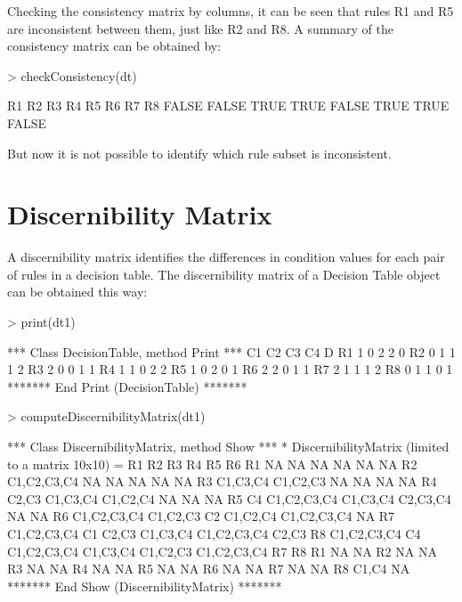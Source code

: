\documentclass[a4paper]{article}
\begin{document}
Checking the consistency matrix by columns, it can be seen that rules R1 and R5 are inconsistent between them, just like R2 and R8. A summary of the consistency matrix can be obtained by:

\begin{Schunk}
\begin{Sinput}
> checkConsistency(dt)
\end{Sinput}
\begin{Soutput}
   R1    R2    R3    R4    R5    R6    R7    R8 
FALSE FALSE  TRUE  TRUE FALSE  TRUE  TRUE FALSE 
\end{Soutput}
\end{Schunk}

But now it is not possible to identify which rule subset is inconsistent.

\section{Discernibility Matrix}

A discernibility matrix identifies the differences in condition values for each pair of rules in a decision table. The discernibility matrix of a Decision Table object can be obtained this way:

\begin{Schunk}
\begin{Sinput}
> print(dt1)
\end{Sinput}
\begin{Soutput}
*** Class DecisionTable, method Print *** 
   C1 C2 C3 C4 D
R1 1  0  2  2  0
R2 0  1  1  1  2
R3 2  0  0  1  1
R4 1  1  0  2  2
R5 1  0  2  0  1
R6 2  2  0  1  1
R7 2  1  1  1  2
R8 0  1  1  0  1
******* End Print (DecisionTable) ******* 
\end{Soutput}
\begin{Sinput}
> computeDiscernibilityMatrix(dt1)
\end{Sinput}
\begin{Soutput}
*** Class DiscernibilityMatrix, method Show *** 
* DiscernibilityMatrix (limited to a matrix 10x10) = 
   R1          R2          R3          R4          R5          R6         
R1          NA          NA          NA          NA          NA          NA
R2 C1,C2,C3,C4          NA          NA          NA          NA          NA
R3    C1,C3,C4    C1,C2,C3          NA          NA          NA          NA
R4       C2,C3    C1,C3,C4    C1,C2,C4          NA          NA          NA
R5          C4 C1,C2,C3,C4    C1,C3,C4    C2,C3,C4          NA          NA
R6 C1,C2,C3,C4    C1,C2,C3          C2    C1,C2,C4 C1,C2,C3,C4          NA
R7 C1,C2,C3,C4          C1       C2,C3    C1,C3,C4 C1,C2,C3,C4       C2,C3
R8 C1,C2,C3,C4          C4 C1,C2,C3,C4    C1,C3,C4    C1,C2,C3 C1,C2,C3,C4
   R7          R8         
R1          NA          NA
R2          NA          NA
R3          NA          NA
R4          NA          NA
R5          NA          NA
R6          NA          NA
R7          NA          NA
R8       C1,C4          NA
******* End Show (DiscernibilityMatrix) ******* 
\end{Soutput}
\end{Schunk}
\end{document}
